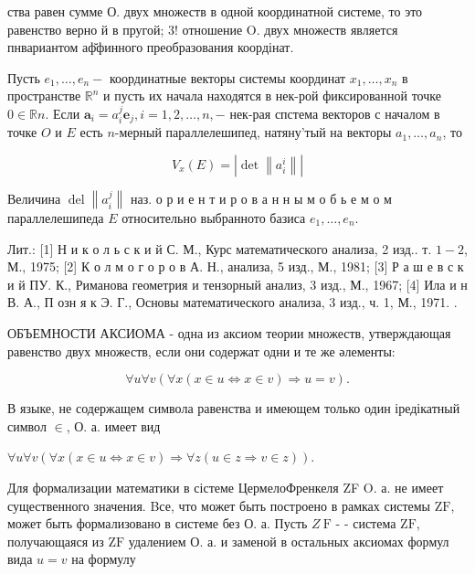 \documentclass[10pt]{article}
\begin{document}
ства равен сумме О. двух множеств в одной координатной системе, то это равенство верно й в пругой; 3! отношение O. двух множеств является пнвариантом аф̆финного преобразования коордінат.



Пусть $e_{1}, \ldots, e_{n}-$ координатные векторы системы координат $x_{1}, \ldots, x_{n}$ в пространстве $\mathbb{R}^{n}$ и пусть их начала находятся в нек-рой фиксированной точке $0 \in \mathbb{R} n$. Если $\boldsymbol{a}_{i}=a_{i}^{j} \boldsymbol{e}_{j}, i=1,2, \ldots, n,-$ нек-рая спстема векторов с началом в точке $O$ и $E$ есть $n$-мерный параллелешипед, натяну'тый на векторы $a_{1}, \ldots, a_{n}$, то



\[

V_{x}(E)=\left|\operatorname{det}\left\|a_{i}^{i}\right\|\right|

\]



Величина $\operatorname{del}\left\|a_{i}^{j}\right\|$ наз. о р и е н т и р о в а н н ы м о б ь е м о м параллелешипеда $E$ относительно выбранното базиса $e_{1}, \ldots, e_{n}$.



Лит.: [1] Н и к о л ь с к и й С. М., Курс математического анализа, 2 изд.. т. $1-2$, М., 1975; [2] К о л м о г о р о в А. Н., анализа, 5 изд., М., 1981; [3] Р а ш е в с к и й ПУ. К., Риманова геометрия и тензорный анализ, 3 изд., М., 1967; [4] Ила и н В. А., П озн я к Э. Г., Основы математического анализа, 3 изд., ч. 1, М., 1971. .



ОБЪЕМНОСТИ АКСИОМА - одна из аксиом теории множеств, утверждающая равенство двух множеств, если они содержат одни и те же әлементы:



\[

\forall u \forall v(\forall x(x \in u \Longleftrightarrow x \in v) \Rightarrow u=v) .

\]



В языке, не содержащем символа равенства и имеющем только один іредікатный символ $\in$, О. а. имеет вид



$\forall u \forall v(\forall x(x \in u \Longleftrightarrow x \in v) \Rightarrow \forall z(u \in z \Rightarrow v \in z))$.



Для формализации математики в сістеме ЦермелоФренкеля ZF O. а. не имеет существенного значения. Bсе, что может быть построено в рамках системы $\mathrm{ZF}$, может быть формализовано в системе без О. а. Пусть $Z \mathrm{~F}$ - - система $\mathrm{ZF}$, получающаяся из $\mathrm{ZF}$ удалением О. а. и заменой в остальных аксиомах формул вида $u=v$ на формулу
\end{document}
